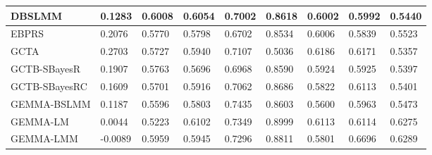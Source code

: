 \documentclass[pdflatex,sn-basic]{sn-jnl}
\begin{document}
\begin{table}[!ht]
{\begin{tabular}{|l|l|l|l|l|l|l|l|l|}
\hline
DBSLMM \cite{Yang_2020} & \cellcolor[HTML]{FCBB7A}0.1283 & \cellcolor[HTML]{BDD881}0.6008 & \cellcolor[HTML]{D1DE82}0.6054 & \cellcolor[HTML]{FEDE81}0.7002 & \cellcolor[HTML]{FCEA84}0.8618 & \cellcolor[HTML]{FEE983}0.6002 & \cellcolor[HTML]{FEE282}0.5992 & \cellcolor[HTML]{FFEB84}0.5440 \\
\hline
EBPRS \cite{Song_2020} & \cellcolor[HTML]{FFEB84}0.2076 & \cellcolor[HTML]{FEE783}0.5770 & \cellcolor[HTML]{FEEA83}0.5798 & \cellcolor[HTML]{FBA977}0.6702 & \cellcolor[HTML]{FEE883}0.8534 & \cellcolor[HTML]{FEEA83}0.6006 & \cellcolor[HTML]{FDC67C}0.5839 & \cellcolor[HTML]{F0E784}0.5523 \\
\hline
GCTA \cite{Yang_2013} & \cellcolor[HTML]{BCD881}0.2703 & \cellcolor[HTML]{FEE282}0.5727 & \cellcolor[HTML]{E6E483}0.5940 & \cellcolor[HTML]{F4E884}0.7107 & \cellcolor[HTML]{F8696B}0.5036 & \cellcolor[HTML]{D8E082}0.6186 & \cellcolor[HTML]{E4E383}0.6171 & \cellcolor[HTML]{FCBA7A}0.5357 \\
\hline
GCTB-SBayesR \cite{Zheng_2024} & \cellcolor[HTML]{FEE182}0.1907 & \cellcolor[HTML]{FEE783}0.5763 & \cellcolor[HTML]{FDD880}0.5696 & \cellcolor[HTML]{FDD880}0.6968 & \cellcolor[HTML]{FEEA83}0.8590 & \cellcolor[HTML]{FDD880}0.5924 & \cellcolor[HTML]{FDD67F}0.5925 & \cellcolor[HTML]{FDD17F}0.5397 \\
\hline
GCTB-SBayesRC \cite{Lloyd_Jones_2019} & \cellcolor[HTML]{FDCF7E}0.1609 & \cellcolor[HTML]{FEDE81}0.5701 & \cellcolor[HTML]{EAE583}0.5916 & \cellcolor[HTML]{FEE983}0.7062 & \cellcolor[HTML]{EDE683}0.8686 & \cellcolor[HTML]{FCC17C}0.5822 & \cellcolor[HTML]{F0E784}0.6113 & \cellcolor[HTML]{FDD47F}0.5401 \\
\hline
GEMMA-BSLMM \cite{Zhou_2012} & \cellcolor[HTML]{FCB579}0.1187 & \cellcolor[HTML]{FDD17F}0.5596 & \cellcolor[HTML]{FFEB84}0.5803 & \cellcolor[HTML]{83C87D}0.7435 & \cellcolor[HTML]{FFEB84}0.8603 & \cellcolor[HTML]{FA9072}0.5600 & \cellcolor[HTML]{FEDD81}0.5963 & \cellcolor[HTML]{F9EA84}0.5473 \\
\hline
GEMMA-LM \cite{Zhou_2012} & \cellcolor[HTML]{F8716C}0.0044 & \cellcolor[HTML]{FBA075}0.5223 & \cellcolor[HTML]{C8DB81}0.6102 & \cellcolor[HTML]{A1D07F}0.7349 & \cellcolor[HTML]{A9D27F}0.8999 & \cellcolor[HTML]{E8E583}0.6113 & \cellcolor[HTML]{F0E784}0.6114 & \cellcolor[HTML]{66BF7C}0.6275 \\
\hline
GEMMA-LMM \cite{Zhou_2012} & \cellcolor[HTML]{F8696B}-0.0089 & \cellcolor[HTML]{CCDD82}0.5959 & \cellcolor[HTML]{E5E483}0.5945 & \cellcolor[HTML]{B3D580}0.7296 & \cellcolor[HTML]{D2DE82}0.8811 & \cellcolor[HTML]{FCBC7B}0.5801 & \cellcolor[HTML]{76C47D}0.6696 & \cellcolor[HTML]{64BF7C}0.6289 \\

\end{tabular}}
\end{table}
\end{document}
